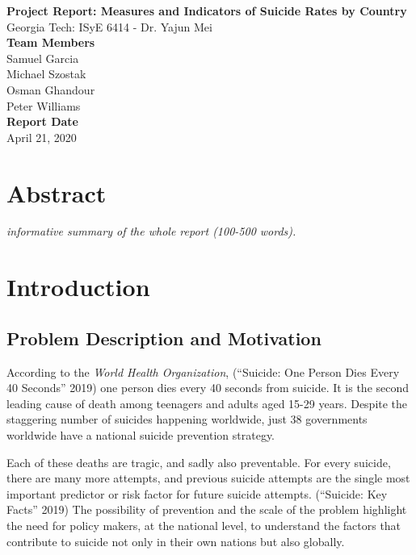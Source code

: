\documentclass[]{article}
\author{}
\date{\vspace{-2.5em}}
\begin{document}
\begin{flushleft}
\LARGE{\textbf{Project Report: Measures and Indicators of Suicide Rates by Country}}\\
\vspace*{2\baselineskip}
\Large{Georgia Tech: ISyE 6414 - Dr. Yajun Mei}\\
\vspace*{3\baselineskip}
\Large{\textbf{Team Members}}\\
Samuel Garcia\\
Michael Szostak\\ 
Osman Ghandour\\ 
Peter Williams\\
\vspace*{2\baselineskip}
\Large{\textbf{Report Date}}\\
April 21, 2020
\newpage
\end{flushleft}

{
\setcounter{tocdepth}{2}
\tableofcontents
}
\newpage

\section{Abstract}\label{abstract}

\emph{informative summary of the whole report (100-500 words).}

\section{Introduction}\label{introduction}

\subsection{Problem Description and
Motivation}\label{problem-description-and-motivation}

According to the \emph{World Health Organization}, (``Suicide: One
Person Dies Every 40 Seconds'' 2019) one person dies every 40 seconds
from suicide. It is the second leading cause of death among teenagers
and adults aged 15-29 years. Despite the staggering number of suicides
happening worldwide, just 38 governments worldwide have a national
suicide prevention strategy.

Each of these deaths are tragic, and sadly also preventable. For every
suicide, there are many more attempts, and previous suicide attempts are
the single most important predictor or risk factor for future suicide
attempts. (``Suicide: Key Facts'' 2019) The possibility of prevention
and the scale of the problem highlight the need for policy makers, at
the national level, to understand the factors that contribute to suicide
not only in their own nations but also globally.
\end{document}
